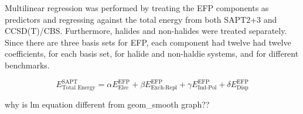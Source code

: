 
Multilinear regression was performed by treating the EFP components as predictors and regressing against the total energy from both SAPT2+3 and CCSD(T)/CBS.
Furthermore, halides and non-halides were treated separately.
Since there are three basis sets for EFP, each component had twelve had twelve coefficients, for each basis set, for halide and non-haldie systems, and for different benchmarks.


\begin{equation}
    E^{\text{SAPT}}_{\text{Total Energy}} = \alpha E_{\text{Elec}}^{\text{EFP}} +
                                            \beta E_{\text{Exch-Repl}}^{\text{EFP}} +
                                            \gamma E_{\text{Ind-Pol}}^{\text{EFP}} +
                                            \delta E_{\text{Disp}}^{\text{EFP}}
\end{equation}

why is lm equation different from geom_smooth graph??

